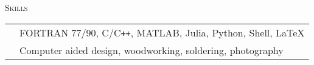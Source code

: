 \documentclass[10pt]{article}
\begin{document}
\vspace{-1.5em}
\begin{multicols}{2}
\textsc{Skills}
\columnbreak

\begin {table}[H]
\begin{tabular}{l l }
\hspace{-0.6em}{Programming  } & \hspace{-0.0em} FORTRAN 77/90, C/C\texttt{++}, MATLAB, Julia, Python, Shell, \LaTeX{}\\
\hspace{-0.6em}{Design} & \hspace{-0.0em} Computer aided design, woodworking, soldering, photography\\
\end{tabular}	
\end{table}

\end{multicols}
\vspace{-1.5em}
\end{document}
